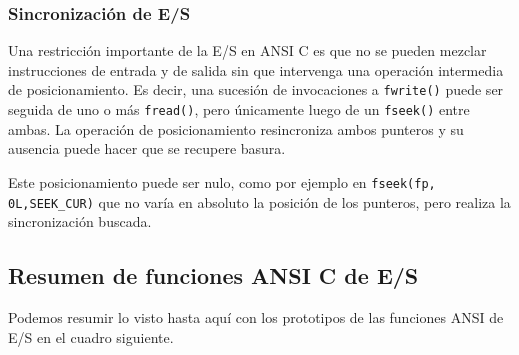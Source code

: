 \subsubsection{Sincronización de E/S}
Una restricción importante de la E/S en ANSI C es que no se pueden mezclar
instrucciones de entrada y de salida sin que intervenga una operación
intermedia de posicionamiento. Es decir, una sucesión de invocaciones a \lstinline{fwrite()} 
puede ser seguida de uno o más \lstinline{fread()}, pero únicamente luego de un \lstinline{fseek()}
entre ambas. La operación de posicionamiento resincroniza ambos punteros y su
ausencia puede hacer que se recupere basura.

Este posicionamiento puede ser nulo, como por ejemplo en \lstinline{fseek(fp, 0L,SEEK_CUR)}
que no varía en absoluto la posición de los punteros, pero realiza la
sincronización buscada.

\subsection{Resumen de funciones ANSI C de E/S}
Podemos resumir lo visto hasta aquí con los prototipos de las funciones ANSI de
E/S en el cuadro siguiente.

